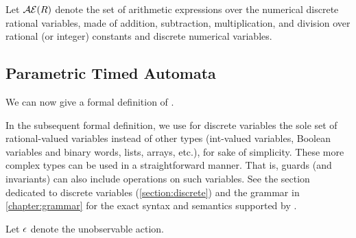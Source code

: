 Let $\mathcal{AE}(R)$ denote the set of arithmetic expressions over the numerical discrete rational variables, \ie{} made of addition, subtraction, multiplication, and division over rational (or integer) constants and discrete numerical variables.



\subsection{\imitator{} Parametric Timed Automata}


We can now give a formal definition of \IPTA{}.

\begin{remark}
	In the subsequent formal definition, we use for discrete variables the sole set of rational-valued variables instead of other types (int-valued variables, Boolean variables and binary words, lists, arrays, etc.), for sake of simplicity.
	These more complex types can be used in a straightforward manner.
	That is, guards (and invariants) can also include operations on such variables.
	See the section dedicated to discrete variables (\cref{section:discrete}) and the grammar in \cref{chapter:grammar} for the exact syntax and semantics supported by \imitator{}.
\end{remark}

Let $\epsilon$ denote the unobservable action.

